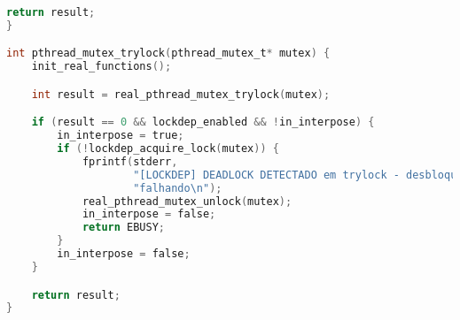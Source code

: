 \begin{lstlisting}[language=C, caption={pthread\_interpose.c - Interposição de funções pthread}]
    return result;
}

int pthread_mutex_trylock(pthread_mutex_t* mutex) {
    init_real_functions();

    int result = real_pthread_mutex_trylock(mutex);

    if (result == 0 && lockdep_enabled && !in_interpose) {
        in_interpose = true;
        if (!lockdep_acquire_lock(mutex)) {
            fprintf(stderr,
                    "[LOCKDEP] DEADLOCK DETECTADO em trylock - desbloqueando e "
                    "falhando\n");
            real_pthread_mutex_unlock(mutex);
            in_interpose = false;
            return EBUSY;
        }
        in_interpose = false;
    }

    return result;
}
\end{lstlisting}
